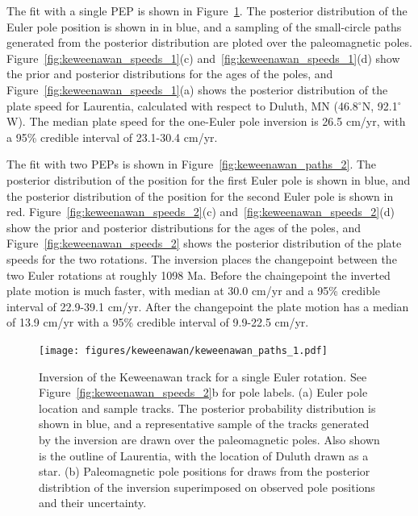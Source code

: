 \documentclass[preprint,12pt,authoryear]{elsarticle}
\begin{document}
The fit with a single PEP is shown in Figure~\ref{fig:keweenawan_paths_1}.
The posterior distribution of the Euler pole position is shown in in blue,
and a sampling of the small-circle paths generated from the posterior distribution are ploted over the paleomagnetic poles.
Figure~\ref{fig:keweenawan_speeds_1}(c) and~\ref{fig:keweenawan_speeds_1}(d) show the prior and posterior distributions for the ages of the poles,
and Figure~\ref{fig:keweenawan_speeds_1}(a) shows the posterior distribution of the plate speed for Laurentia,
calculated with respect to Duluth, MN (46.8$^\circ$N, 92.1$^\circ$W).
The median plate speed for the one-Euler pole inversion is 26.5 cm/yr, with a 95\% credible interval of 23.1-30.4 cm/yr.

The fit with two PEPs is shown in Figure~\ref{fig:keweenawan_paths_2}.
The posterior distribution of the position for the first Euler pole is shown in blue,
and the posterior distribution of the position for the second Euler pole is shown in red.
Figure~\ref{fig:keweenawan_speeds_2}(c) and~\ref{fig:keweenawan_speeds_2}(d) show the prior and posterior distributions for the ages of the poles,
and Figure~\ref{fig:keweenawan_speeds_2} shows the posterior distribution of the plate speeds for the two rotations.
The inversion places the changepoint between the two Euler rotations at roughly 1098 Ma.
Before the chaingepoint the inverted plate motion is much faster, with median at 30.0 cm/yr
and a 95\% credible interval of 22.9-39.1 cm/yr. After the changepoint the plate motion has a median
of 13.9 cm/yr with a 95\% credible interval of 9.9-22.5 cm/yr.


\begin{figure}
\texttt{[image: figures/keweenawan/keweenawan\_paths\_1.pdf]}
\caption[Inversion of the Keweenawan track for a single Euler rotation]{Inversion of the Keweenawan track for a single Euler rotation. See Figure~\ref{fig:keweenawan_speeds_2}b for pole labels. 
(a) Euler pole location and sample tracks. The posterior probability distribution is shown in blue, and a representative sample of the tracks generated by the inversion are drawn over the paleomagnetic poles. Also shown is the outline of Laurentia, with the location of Duluth drawn as a star.
(b) Paleomagnetic pole positions for draws from the posterior distribtion of the inversion superimposed on observed pole positions and their uncertainty.}
\label{fig:keweenawan_paths_1}
\end{figure}
\end{document}
